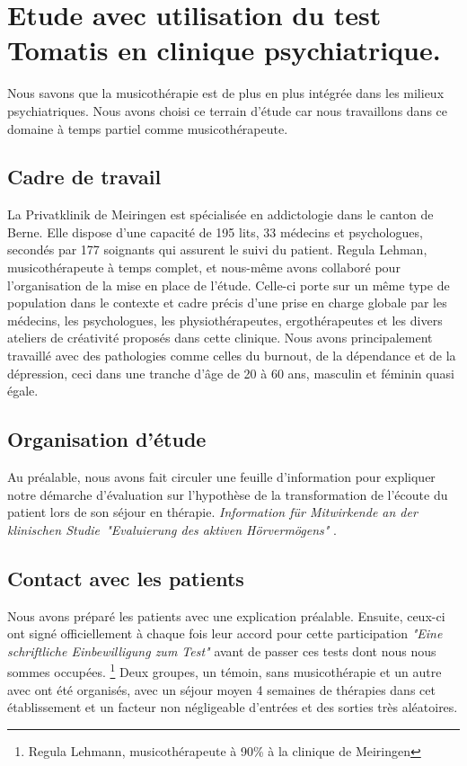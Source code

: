 \chapter{Etude avec utilisation du test Tomatis en clinique psychiatrique.}
Nous savons que la musicothérapie est de plus en plus intégrée dans
les milieux psychiatriques. Nous avons choisi ce terrain d'étude car 
nous  travaillons dans ce domaine  à temps partiel comme musicothérapeute.
\section{Cadre de travail}
 La Privatklinik
de Meiringen est  spécialisée en
addictologie dans le canton de Berne. Elle dispose d'une capacité de 195 lits, 33 médecins et
psychologues, secondés par 177 soignants qui assurent le suivi du
patient. Regula Lehman, musicothérapeute à temps complet, et nous-même avons
collaboré  pour l'organisation de la mise en place de l'étude. Celle-ci porte sur un même type de
population dans le contexte et cadre  précis d'une prise en charge globale
par les médecins, les psychologues, les physiothérapeutes,
ergothérapeutes et les divers ateliers de créativité proposés dans
cette clinique. Nous avons principalement travaillé avec des
pathologies comme celles du burnout, de la dépendance et de la
dépression, ceci dans une tranche d'âge de 20 à 60 ans, masculin et
féminin quasi égale. 
\section{Organisation d'étude}
Au préalable, nous avons fait circuler une
feuille d'information pour expliquer notre démarche d'évaluation sur
l'hypothèse de la transformation de l'écoute du patient lors de son
séjour en thérapie. \emph{Information für Mitwirkende an der klinischen
Studie\  "Evaluierung des aktiven Hörvermögens" }. 
 
 \section{Contact avec les patients}
 
 Nous avons
préparé les patients avec une explication préalable. Ensuite,
ceux-ci ont signé officiellement à chaque fois leur
accord pour cette participation  \emph{"Eine schriftliche Einbewilligung zum
Test"} avant de passer ces tests dont nous nous sommes occupées.
  \footnote{Regula
  Lehmann, musicothérapeute  à 90\%  à la clinique de Meiringen} Deux groupes, un témoin, sans
musicothérapie et un autre avec ont été organisés, avec un séjour moyen 4 semaines de thérapies dans cet établissement et un facteur non négligeable d'entrées et des sorties très aléatoires.


